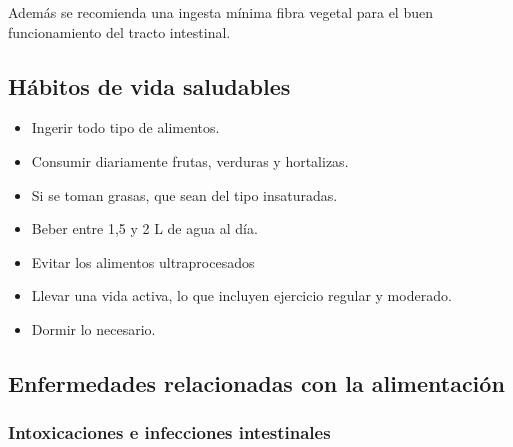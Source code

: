 \documentclass{article}
\begin{document}
		\begin{table}[htp]
			\caption{Recomendaciones nutricionales}
			\begin{center}
			\end{center}
			\label{Recomendaciones}
		\end{table}%
	
		Además se recomienda una ingesta mínima fibra vegetal para el buen funcionamiento del tracto intestinal.
		
		\subsection{Hábitos de vida saludables}
	
			\begin{itemize}
				\item Ingerir todo tipo de alimentos.
				\item Consumir diariamente frutas, verduras y hortalizas.
				\item Si se toman grasas, que sean del tipo insaturadas.
				\item Beber entre 1,5 y 2 L de agua al día.
				\item Evitar los alimentos ultraprocesados
				\item Llevar una vida activa, lo que incluyen ejercicio regular y moderado.
				\item Dormir lo necesario.
			\end{itemize}
			
		\subsection{Enfermedades relacionadas con la alimentación}
		
			\subsubsection*{Intoxicaciones e infecciones intestinales}
			
\end{document}
